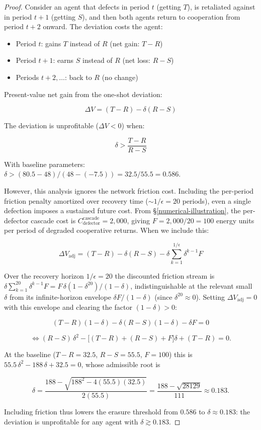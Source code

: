\documentclass[11pt]{article}
\theoremstyle{plain}
\theoremstyle{definition}
\theoremstyle{remark}
\begin{document}
\begin{proof}
Consider an agent that defects in period $t$ (getting $T$), is retaliated against in period $t+1$ (getting $S$), and then both agents return to cooperation from period $t+2$ onward. The deviation costs the agent:

\begin{itemize}
\item Period $t$: gains $T$ instead of $R$ (net gain: $T - R$)
\item Period $t+1$: earns $S$ instead of $R$ (net loss: $R - S$)
\item Periods $t+2, \ldots$: back to $R$ (no change)
\end{itemize}
Present-value net gain from the one-shot deviation:

$$\Delta V = (T - R) - \delta(R - S)$$

The deviation is unprofitable ($\Delta V < 0$) when:

$$\delta > \frac{T - R}{R - S}$$

With baseline parameters: $\delta > (80.5 - 48)/(48 - (-7.5)) = 32.5/55.5 = 0.586$.

However, this analysis ignores the network friction cost. Including the per-period friction penalty amortized over recovery time ($\sim 1/\epsilon = 20$ periods), even a single defection imposes a sustained future cost. From §\ref{numerical-illustration}, the per-defector cascade cost is $C_{\text{defector}}^{\text{cascade}} = 2{,}000$, giving $F = 2{,}000 / 20 = 100$ energy units per period of degraded cooperative returns. When we include this:

$$\Delta V_{\text{adj}} = (T - R) - \delta(R - S) - \delta \sum_{k=1}^{1/\epsilon} \delta^{k-1} F$$

Over the recovery horizon $1/\epsilon = 20$ the discounted friction stream is $\delta\sum_{k=1}^{20}\delta^{k-1}F = F\,\delta(1 - \delta^{20})/(1 - \delta)$, indistinguishable at the relevant small $\delta$ from its infinite-horizon envelope $\delta F/(1 - \delta)$ (since $\delta^{20} \approx 0$). Setting $\Delta V_{\text{adj}} = 0$ with this envelope and clearing the factor $(1 - \delta) > 0$:

$$(T - R)(1 - \delta) - \delta(R - S)(1 - \delta) - \delta F = 0$$

$$\iff (R - S)\,\delta^2 - \bigl[(T - R) + (R - S) + F\bigr]\delta + (T - R) = 0.$$

At the baseline ($T - R = 32.5$, $R - S = 55.5$, $F = 100$) this is $55.5\,\delta^2 - 188\,\delta + 32.5 = 0$, whose admissible root is

$$\delta = \frac{188 - \sqrt{188^2 - 4(55.5)(32.5)}}{2(55.5)} = \frac{188 - \sqrt{28129}}{111} \approx 0.183.$$

Including friction thus lowers the erasure threshold from $0.586$ to $\delta \approx 0.183$: the deviation is unprofitable for any agent with $\delta \gtrsim 0.183$.
\end{proof}
\end{document}
